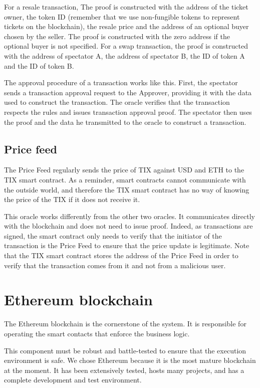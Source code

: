 \documentclass[a4paper,11pt,oneside]{report}
\begin{document}
For a resale transaction, The proof is constructed with the address of the ticket owner, the token ID (remember that we use non-fungible tokens to represent tickets on the blockchain), the resale price and the address of an optional buyer chosen by the seller. The proof is constructed with the zero address if the optional buyer is not specified. For a swap transaction, the proof is constructed with the address of spectator A, the address of spectator B, the ID of token A and the ID of token B.

The approval procedure of a transaction works like this. First, the spectator sends a transaction approval request to the Approver, providing it with the data used to construct the transaction. The oracle verifies that the transaction respects the rules and issues transaction approval proof. The spectator then uses the proof and the data he transmitted to the oracle to construct a transaction.


\subsection{Price feed}
The Price Feed regularly sends the price of TIX against USD and ETH to the TIX smart contract. As a reminder, smart contracts cannot communicate with the outside world, and therefore the TIX smart contract has no way of knowing the price of the TIX if it does not receive it.

This oracle works differently from the other two oracles. It communicates directly with the blockchain and does not need to issue proof. Indeed, as transactions are signed, the smart contract only needs to verify that the initiator of the transaction is the Price Feed to ensure that the price update is legitimate. Note that the TIX smart contract stores the address of the Price Feed in order to verify that the transaction comes from it and not from a malicious user.

\section{Ethereum blockchain}
The Ethereum blockchain is the cornerstone of the system. It is responsible for operating the smart contacts that enforce the business logic.

This component must be robust and battle-tested to ensure that the execution environment is safe. We chose Ethereum because it is the most mature blockchain at the moment. It has been extensively tested, hosts many projects, and has a complete development and test environment.
\end{document}
